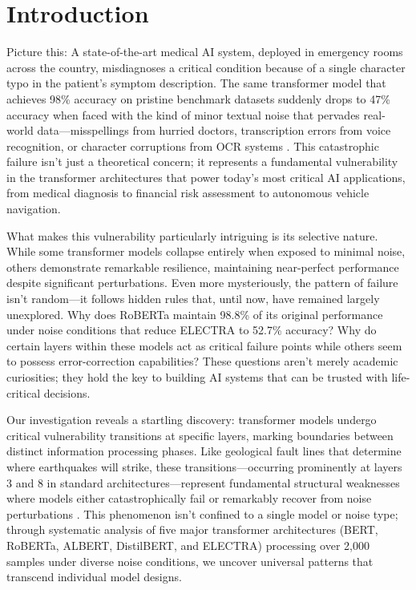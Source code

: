 \section{Introduction}
\label{sec:introduction}

Picture this: A state-of-the-art medical AI system, deployed in emergency rooms across the country, misdiagnoses a critical condition because of a single character typo in the patient's symptom description. The same transformer model that achieves 98\% accuracy on pristine benchmark datasets suddenly drops to 47\% accuracy when faced with the kind of minor textual noise that pervades real-world data---misspellings from hurried doctors, transcription errors from voice recognition, or character corruptions from OCR systems \cite{alanzi2023chatgpt,piryani2025ocr}. This catastrophic failure isn't just a theoretical concern; it represents a fundamental vulnerability in the transformer architectures that power today's most critical AI applications, from medical diagnosis to financial risk assessment to autonomous vehicle navigation.

What makes this vulnerability particularly intriguing is its selective nature. While some transformer models collapse entirely when exposed to minimal noise, others demonstrate remarkable resilience, maintaining near-perfect performance despite significant perturbations. Even more mysteriously, the pattern of failure isn't random---it follows hidden rules that, until now, have remained largely unexplored. Why does RoBERTa maintain 98.8\% of its original performance under noise conditions that reduce ELECTRA to 52.7\% accuracy? Why do certain layers within these models act as critical failure points while others seem to possess error-correction capabilities? These questions aren't merely academic curiosities; they hold the key to building AI systems that can be trusted with life-critical decisions.

Our investigation reveals a startling discovery: transformer models undergo critical vulnerability transitions at specific layers, marking boundaries between distinct information processing phases. Like geological fault lines that determine where earthquakes will strike, these transitions---occurring prominently at layers 3 and 8 in standard architectures---represent fundamental structural weaknesses where models either catastrophically fail or remarkably recover from noise perturbations \cite{vanaken2019bert,tenney2019bert}. This phenomenon isn't confined to a single model or noise type; through systematic analysis of five major transformer architectures (BERT, RoBERTa, ALBERT, DistilBERT, and ELECTRA) processing over 2,000 samples under diverse noise conditions, we uncover universal patterns that transcend individual model designs.

